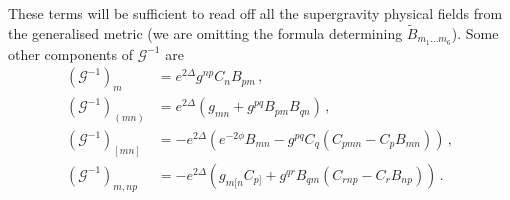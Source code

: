 \documentclass[debug]{phd}
\begin{document}
					These terms will be sufficient to read off all the supergravity physical fields from the generalised metric (we are omitting the formula determining $\tilde B_{m_1\ldots m_6}$).
					Some other components of $\mathcal{G}^{-1}$ are
							\begin{equation}\label{invG_comp_2}
								\begin{split}
									(\mathcal{G}^{-1})_{m} &= e^{2\Delta}g^{np}C_n B_{pm} \, , \\[1mm]
									(\mathcal{G}^{-1})_{(mn)} &= e^{2\Delta}\left( g_{mn} + g^{pq}B_{pm}B_{qn}\right)\, , \\[1mm]
									(\mathcal{G}^{-1})_{[mn]} &= - e^{2\Delta}\left( e^{-2\phi}B_{mn} - g^{pq}C_q\left( C_{pmn} - C_{p}B_{mn} \right) \right) \, , \\[1mm]
									(\mathcal{G}^{-1})_{m,np} &= -e^{2\Delta}\left(g_{m[n}C_{p]} + g^{qr}B_{qm}\left( C_{rnp} - C_{r}B_{np} \right) \right) \, .
								\end{split}
							\end{equation}
						
\end{document}
